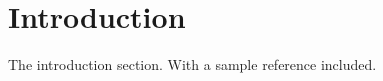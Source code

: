 
\section{Introduction} %
\label{sec:introduction}
	The introduction section.
    With a sample reference \citep{cranny2016sample} included.
